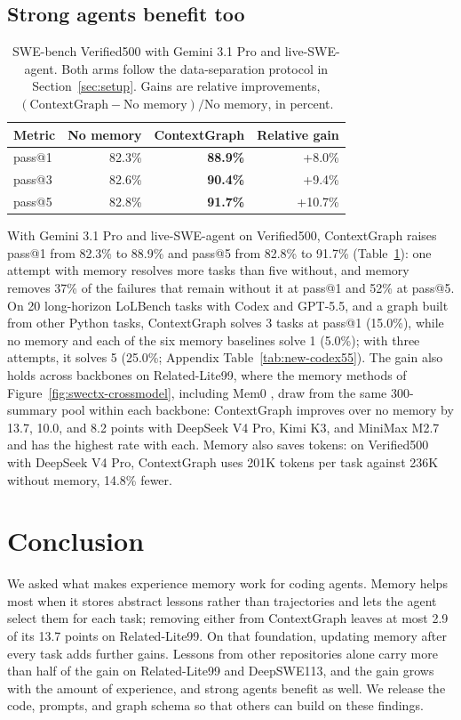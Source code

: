 \documentclass{article}
\begin{document}
\subsection{Strong agents benefit too}
\label{sec:backbones}
\begin{table}[!htbp]
\centering
\caption{SWE-bench Verified500 with Gemini 3.1 Pro and live-SWE-agent.
Both arms follow the data-separation protocol
in Section~\ref{sec:setup}. Gains are relative improvements,
$(\text{ContextGraph}-\text{No memory})/\text{No memory}$, in percent.}
\label{tab:new-gemini}
\small
\begin{tabular}{lrrr}
\toprule
Metric & No memory & ContextGraph & Relative gain \\
\midrule
pass@1 & 82.3\% & \textbf{88.9\%} & +8.0\% \\
pass@3 & 82.6\% & \textbf{90.4\%} & +9.4\% \\
pass@5 & 82.8\% & \textbf{91.7\%} & +10.7\% \\
\bottomrule
\end{tabular}
\end{table}
With Gemini 3.1 Pro and live-SWE-agent on Verified500, ContextGraph raises
pass@1 from 82.3\% to 88.9\% and pass@5 from 82.8\% to 91.7\%
(Table~\ref{tab:new-gemini}): one attempt with memory resolves more tasks than
five without, and memory removes 37\% of the failures that remain without it
at pass@1 and 52\% at pass@5. On 20 long-horizon LoLBench tasks with Codex
and GPT-5.5, and a graph built from other Python tasks, ContextGraph solves 3
tasks at pass@1 (15.0\%), while no memory and each of the six memory
baselines solve 1 (5.0\%); with three attempts, it solves 5 (25.0\%; Appendix
Table~\ref{tab:new-codex55}). The gain also holds across backbones on
Related-Lite99, where the memory methods of
Figure~\ref{fig:swectx-crossmodel}, including Mem0 \citep{mem02025}, draw
from the same 300-summary pool within each backbone: ContextGraph improves
over no memory by 13.7, 10.0, and 8.2 points with DeepSeek V4 Pro, Kimi K3,
and MiniMax M2.7 and has the highest rate with each. Memory also saves tokens: on
Verified500 with DeepSeek V4 Pro, ContextGraph uses 201K tokens per task
against 236K without memory, 14.8\% fewer.


\FloatBarrier
\section{Conclusion}
We asked what makes experience memory work for coding agents. Memory helps most when it stores abstract lessons rather than
trajectories and lets the agent select them for each task; removing either
from ContextGraph leaves at most 2.9 of its 13.7 points on Related-Lite99. On
that foundation, updating memory after every task adds further gains. Lessons
from other repositories alone carry more than half of the gain on
Related-Lite99 and DeepSWE113, and the gain grows with the amount of
experience, and strong agents benefit as well. We release the
code, prompts, and graph schema so that others can build on these findings.
\end{document}
